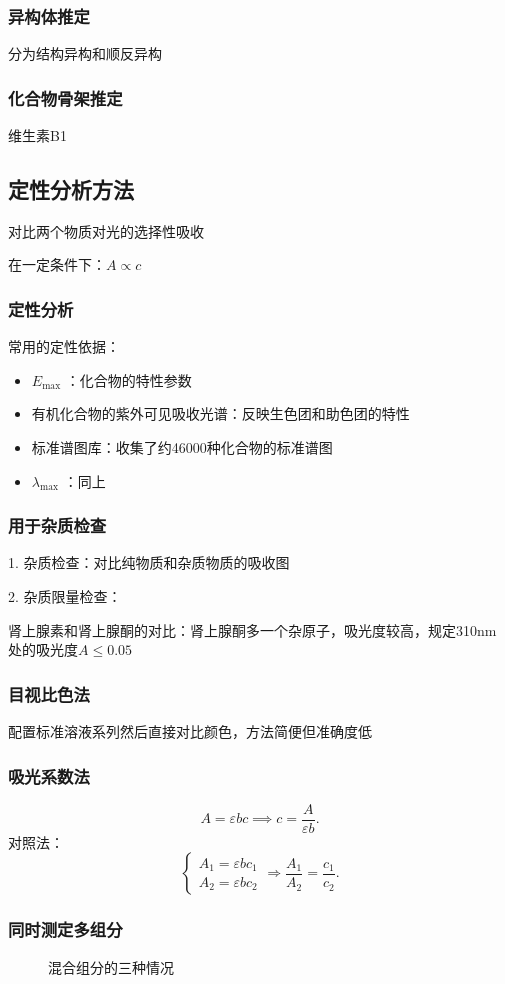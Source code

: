 \subsubsection*{异构体推定}%
\label{subsub*:异构体推定}
分为结构异构和顺反异构
\subsubsection*{化合物骨架推定}%
\label{subsub*:化合物骨架推定}
\begin{eg}
    维生素B1
\end{eg}
\subsection{定性分析方法}%
\label{sub:定性分析方法}
对比两个物质对光的选择性吸收
\begin{eg}
    在一定条件下：$A\propto c$
\end{eg}
\subsubsection*{定性分析}%
\label{subsub*:定性分析}
常用的定性依据：
\begin{itemize}
    \item $E_{\max }$ ：化合物的特性参数
    \item 有机化合物的紫外可见吸收光谱：反映生色团和助色团的特性
    \item 标准谱图库：收集了约46000种化合物的标准谱图
    \item $\lambda_{\max }$ ：同上
    
\end{itemize}
\subsubsection*{用于杂质检查}%
\label{subsub*:用于杂质检查}
1. 杂质检查：对比纯物质和杂质物质的吸收图

2. 杂质限量检查：
\begin{eg}
    肾上腺素和肾上腺酮的对比：肾上腺酮多一个杂原子，吸光度较高，规定310nm 处的吸光度$A\le 0.05$
\end{eg}
\subsubsection*{目视比色法}%
\label{subsub*:目视比色法}
配置标准溶液系列然后直接对比颜色，方法简便但准确度低
\subsubsection*{吸光系数法}%
\label{subsub*:吸光系数法}
\[
    A = \varepsilon bc \implies c = \frac{A}{\varepsilon b}
.\]
对照法：\[
    \begin{cases}
        A_1 = \varepsilon bc_1\\
        A_2 = \varepsilon bc_2
    \end{cases} \Rightarrow \frac{A_1}{A_2} = \frac{c_1}{c_2}
.\]
\subsubsection*{同时测定多组分}%
\label{subsub*:同时测定多组分}
\begin{figure}[ht!]
    \centering
    \caption{混合组分的三种情况}
    \label{fig:混合组分的三种情况}
\end{figure}
